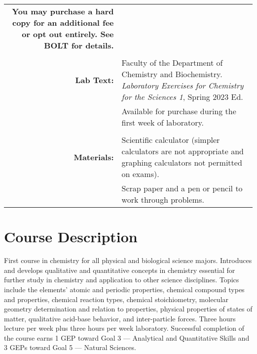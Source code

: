 \documentclass[11pt,letterpaper]{article}
\begin{document}
\begin{tabularx}{\linewidth} {@{\qquad}>{\bfseries\sffamily}r
	>{\raggedright\arraybackslash}X@{\qquad}}
	      You may purchase a hard copy for an additional fee or opt out
	      entirely. See BOLT for details.
	      \\ \\
	Lab Text: & Faculty of the Department of Chemistry and
	Biochemistry. \textit{Laboratory Exercises for Chemistry for
			      the Sciences 1}, Spring 2023 Ed. \\
	       	      & \footnotesize Available for purchase during the first
		      week of laboratory. \\ \\
	Materials: & Scientific calculator (simpler calculators
	are not appropriate and graphing calculators not permitted on exams). \\
		   & Scrap paper and a pen or pencil to work through problems.
		   \\
	\bottomrule
\end{tabularx}

\section{Course Description}
First course in chemistry for all physical and biological science majors.
Introduces and develops qualitative and quantitative concepts in chemistry
essential for further study in chemistry and application to other science
disciplines. Topics include the elements' atomic and periodic properties,
chemical compound types and properties, chemical reaction types, chemical
stoichiometry, molecular geometry determination and relation to properties,
physical properties of states of matter, qualitative acid-base behavior, and
inter-particle forces. Three hours lecture per week plus three hours per week
laboratory. Successful completion of the course earns 1 GEP toward Goal 3 ---
Analytical and Quantitative Skills and 3 GEPs toward Goal 5 --- Natural
Sciences.
\end{document}
